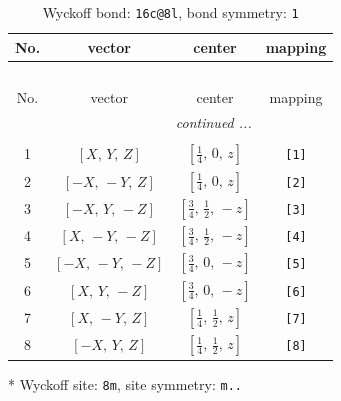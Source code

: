 \documentclass[fleqn,8pt]{jsarticle}
\begin{document}
\renewcommand{\arraystretch}{1.2}
\begin{longtable}{cccc}
\caption{Wyckoff bond: {\tt 16c@8l}, bond symmetry: {\tt 1}}
 \\
 \hline \hline
No. & vector & center & mapping \\ \hline \endfirsthead

\multicolumn{3}{l}{\tablename\ \thetable{}} \\
 \hline \hline
No. & vector & center & mapping \\ \hline \endhead

 \hline \hline
\multicolumn{3}{r}{\footnotesize\it continued ...} \\ \endfoot

 \hline \hline
\multicolumn{3}{r}{} \\ \endlastfoot

1 & $\left[ X,\, Y,\, Z \right]$ & $\left[ \frac{1}{4},\, 0,\, z \right]$ & {\tt [1]} \\ \hline
2 & $\left[ - X,\, - Y,\, Z \right]$ & $\left[ \frac{1}{4},\, 0,\, z \right]$ & {\tt [2]} \\ \hline
3 & $\left[ - X,\, Y,\, - Z \right]$ & $\left[ \frac{3}{4},\, \frac{1}{2},\, - z \right]$ & {\tt [3]} \\ \hline
4 & $\left[ X,\, - Y,\, - Z \right]$ & $\left[ \frac{3}{4},\, \frac{1}{2},\, - z \right]$ & {\tt [4]} \\ \hline
5 & $\left[ - X,\, - Y,\, - Z \right]$ & $\left[ \frac{3}{4},\, 0,\, - z \right]$ & {\tt [5]} \\ \hline
6 & $\left[ X,\, Y,\, - Z \right]$ & $\left[ \frac{3}{4},\, 0,\, - z \right]$ & {\tt [6]} \\ \hline
7 & $\left[ X,\, - Y,\, Z \right]$ & $\left[ \frac{1}{4},\, \frac{1}{2},\, z \right]$ & {\tt [7]} \\ \hline
8 & $\left[ - X,\, Y,\, Z \right]$ & $\left[ \frac{1}{4},\, \frac{1}{2},\, z \right]$ & {\tt [8]} \\
\end{longtable}
* Wyckoff site: {\tt 8m}, site symmetry: {\tt m..}
\renewcommand{\arraystretch}{1.2}
\end{document}
